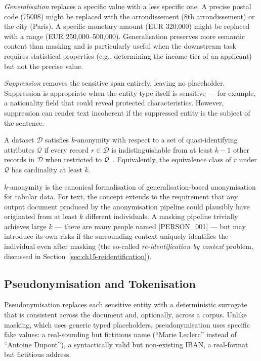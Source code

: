 \emph{Generalisation} replaces a specific value with a less specific one. A precise postal code (75008) might be replaced with the arrondissement (8th arrondissement) or the city (Paris). A specific monetary amount (EUR 320,000) might be replaced with a range (EUR 250,000–500,000). Generalisation preserves more semantic content than masking and is particularly useful when the downstream task requires statistical properties (e.g., determining the income tier of an applicant) but not the precise value.

\emph{Suppression} removes the sensitive span entirely, leaving no placeholder. Suppression is appropriate when the entity type itself is sensitive — for example, a nationality field that could reveal protected characteristics. However, suppression can render text incoherent if the suppressed entity is the subject of the sentence.

\begin{definition}[$k$-Anonymity]
\label{def:k-anonymity}
A dataset $\mathcal{D}$ satisfies $k$-anonymity with respect to a set of quasi-identifying attributes $\mathcal{Q}$ if every record $r \in \mathcal{D}$ is indistinguishable from at least $k-1$ other records in $\mathcal{D}$ when restricted to $\mathcal{Q}$~\citep{sweeney2002k}. Equivalently, the equivalence class of $r$ under $\mathcal{Q}$ has cardinality at least $k$.
\end{definition}

$k$-anonymity is the canonical formalisation of generalisation-based anonymisation for tabular data. For text, the concept extends to the requirement that any output document produced by the anonymisation pipeline could plausibly have originated from at least $k$ different individuals. A masking pipeline trivially achieves large $k$ — there are many people named [PERSON\_001] — but may introduce its own risks if the surrounding context uniquely identifies the individual even after masking (the so-called \emph{re-identification by context} problem, discussed in Section~\ref{sec:ch15-reidentification}).

\subsection{Pseudonymisation and Tokenisation}
\label{sec:ch15-pseudonymisation}

Pseudonymisation replaces each sensitive entity with a deterministic surrogate that is consistent across the document and, optionally, across a corpus. Unlike masking, which uses generic typed placeholders, pseudonymisation uses specific fake values: a real-sounding but fictitious name (``Marie Leclerc'' instead of ``Antoine Dupont''), a syntactically valid but non-existing IBAN, a real-format but fictitious address.


